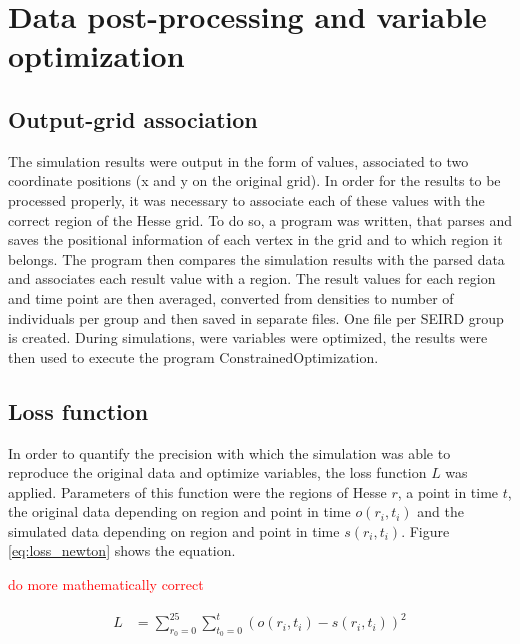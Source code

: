 
\section{Data post-processing and variable optimization}
\label{sec:post_proc}
\subsection{Output-grid association}
The simulation results were output in the form of values, associated to two coordinate positions (x and y on the
original grid). In order for the results to be processed properly, it was necessary to associate each of these
values with the correct region of the Hesse grid. To do so, a program was written, that parses and saves the positional
information of each vertex in the grid and to which region it belongs. The program then compares the simulation results
with the parsed data and associates each result value with a region. The result values for each region and time point
are then averaged, converted from densities to number of individuals per group and then saved in separate files.
One file per SEIRD group is created. During simulations, were variables were optimized, the results were then used to
execute the program ConstrainedOptimization.


\subsection{Loss function}
In order to quantify the precision with which the simulation was able to reproduce the original data and optimize variables, the loss function $L$
was applied. Parameters of this function were the regions of Hesse $r$, a point in time $t$, the original data depending on
region and point in time $o(r_i,t_i)$ and the simulated data depending on region and point in time $s(r_i, t_i)$. Figure \ref*{eq:loss_newton}
shows the equation.

\textcolor{red}{do more mathematically correct}

\begin{align}
	L &= \sum_{r_0=0}^{25} \sum_{t_{0}=0}^{t} (o(r_i,t_i) - s(r_i,t_i))^{2}
	\label{eq:loss_newton}
\end{align}


